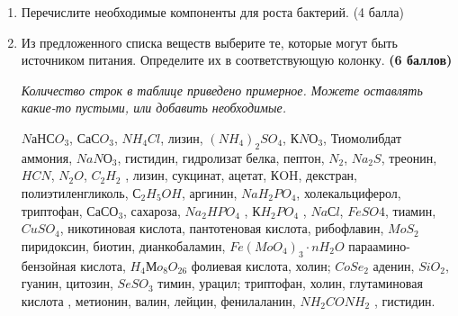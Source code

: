 
\begin{enumerate}
    \item Перечислите необходимые компоненты для роста бактерий. 
    (4 балла)
    
    \item Из предложенного списка веществ выберите те, которые могут быть источником питания. Определите их в соответствующую колонку. \textbf{(6 баллов)} 
    
    \textit{Количество строк в таблице приведено примерное. Можете оставлять какие-то пустыми, или добавить необходимые.}
    
    $NаНСO_3$, $СаСO_3$, $NH_4Cl$, лизин, $(NH_4)
    _2SO_4$, $КNО_3$, Тиомолибдат аммония, $NaNО_3$, гистидин, гидролизат белка, пептон, $N_2$, $Na_2S$, треонин, $HCN$, $N_2O$, $C_2H_2$ , лизин, сукцинат, ацетат, КOH, декстран, полиэтиленгликоль, $С_2H_5OH$, аргинин, $NaH_2PO_4$, холекальциферол, триптофан, $СаСО_3$, сахароза, $Na_2HPO_4$ , $КH_2PO_4$ , $NaСl$, $FeSO4$, тиамин,$CuSO_4$, никотиновая кислота, пантотеновая кислота, рибофлавин, $MoS_2$ пиридоксин, биотин, дианкобаламин, $Fe(MoO_4)_3 \cdot nH_2O$  параамино-бензойная кислота, $H_4Мo_8O_{26}$ фолиевая кислота, холин;  $CoSe_2$ аденин, $SiO_2$, гуанин, цитозин, $SeSO_3$ тимин, урацил; триптофан, холин, глутаминовая кислота , метионин, валин, лейцин, фенилаланин, $NH_2CONH_2$ , гистидин.


\end{enumerate}
